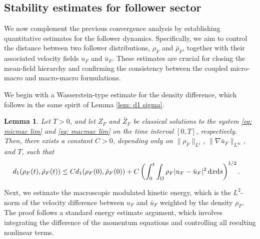 \documentclass[10pt, reqno]{amsart}
\newtheorem{lemma}[theorem]{Lemma}
\theoremstyle{definition}
\theoremstyle{remark}
\numberwithin{equation}{section}
\newcommand{\dx}{\textnormal{d}x}
\newcommand{\ds}{\textnormal{d}s}
\begin{document}
%
%
%
%
%
%

\subsection{Stability estimates for follower sector}
We now complement the previous convergence analysis by establishing quantitative estimates for the follower dynamics. Specifically, we aim to control the distance between two follower distributions, $\rho_F$ and $\bar \rho_F$, together with their associated velocity fields $u_F$ and $\bar u_F$. These estimates are crucial for closing the mean-field hierarchy and confirming the consistency between the coupled micro-macro and macro-macro formulations.

We begin with a Wasserstein-type estimate for the density difference, which follows in the same spirit of Lemma \ref{lem: d1 sigma}.

\begin{lemma} Let $T>0$, and let $Z_F$ and $\bar Z_F$ be classical solutions to the system \eqref{eq: micmac lim} and \eqref{eq: macmac lim} on the time interval $[0,T]$, respectively. Then, there exists a constant $C>0$, depending only on $\|\rho_F\|_{L^1}$,  $\|\nabla \bar u_F\|_{L^\infty}$, and $T$, such that 
    \begin{align*}
        &d_{1}(\rho_F(t), \bar \rho_F(t)) \le C d_{1}(\rho_F(0), \bar \rho_F(0)) + C \left(\int_0^t \int_{\Omega} \rho_F |u_F - \bar u_F|^2\,\dx\ds\right)^{1/2}.
    \end{align*}
\end{lemma}
 
 Next, we estimate the macroscopic modulated kinetic energy, which is the $L^2$-norm of the velocity difference between $u_F$ and $\bar u_F$ weighted by the density $\rho_F$. The proof follows a standard energy estimate argument, which involves integrating the difference of the momentum equations and controlling all resulting nonlinear terms.
 
\end{document}
